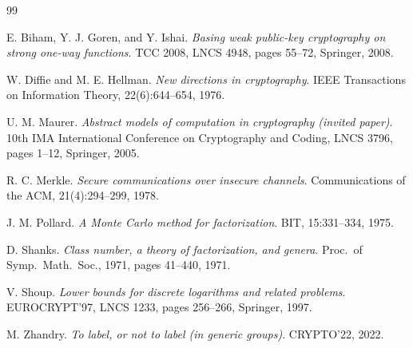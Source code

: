 \documentclass{conjura-conjecture}
\begin{document}
\begin{conjurabibliography}{99}

E. Biham, Y. J. Goren, and Y. Ishai.
\emph{Basing weak public-key cryptography on strong one-way functions}.
TCC 2008, LNCS 4948, pages 55--72, Springer, 2008.

W. Diffie and M. E. Hellman.
\emph{New directions in cryptography}.
IEEE Transactions on Information Theory, 22(6):644--654, 1976.

U. M. Maurer.
\emph{Abstract models of computation in cryptography (invited paper)}.
10th IMA International Conference on Cryptography and Coding, LNCS 3796,
pages 1--12, Springer, 2005.

R. C. Merkle.
\emph{Secure communications over insecure channels}.
Communications of the ACM, 21(4):294--299, 1978.

J. M. Pollard.
\emph{A Monte Carlo method for factorization}.
BIT, 15:331--334, 1975.

D. Shanks.
\emph{Class number, a theory of factorization, and genera}.
Proc.\ of Symp.\ Math.\ Soc., 1971, pages 41--440, 1971.

V. Shoup.
\emph{Lower bounds for discrete logarithms and related problems}.
EUROCRYPT'97, LNCS 1233, pages 256--266, Springer, 1997.

M. Zhandry.
\emph{To label, or not to label (in generic groups)}.
CRYPTO'22, 2022.

\end{conjurabibliography}
\end{document}
